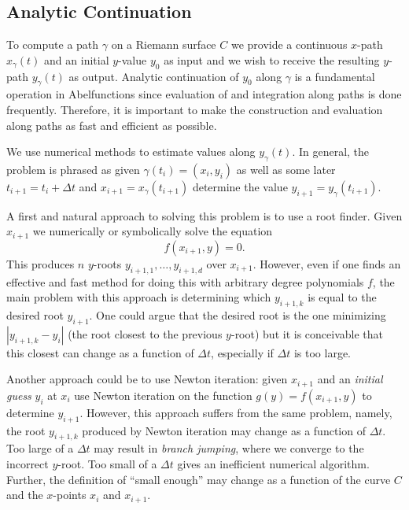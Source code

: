 \subsection{Analytic
  Continuation}\label{subsec:abelfunctions-analytic-continuation}


To compute a path $\gamma$ on a Riemann surface $C$ we provide a continuous
$x$-path $x_\gamma(t)$ and an initial $y$-value $y_0$ as input and we wish to
receive the resulting $y$-path $y_\gamma(t)$ as output. Analytic continuation of
$y_0$ along $\gamma$ is a fundamental operation in Abelfunctions since
evaluation of and integration along paths is done frequently. Therefore, it is
important to make the construction and evaluation along paths as fast and
efficient as possible.

We use numerical methods to estimate values along $y_\gamma(t)$. In general, the
problem is phrased as given $\gamma(t_i) = (x_i,y_i)$ as well as some later
$t_{i+1} = t_i + \Delta t$ and $x_{i+1} = x_\gamma(t_{i+1})$ determine the value
$y_{i+1} = y_\gamma(t_{i+1})$.

A first and natural approach to solving this problem is to use a root finder.
Given $x_{i+1}$ we numerically or symbolically solve the equation
\[
  f(x_{i+1},y) = 0.
\]
This produces $n$ $y$-roots $y_{i+1,1}, \ldots, y_{i+1,d}$ over $x_{i+1}$.
However, even if one finds an effective and fast method for doing this with
arbitrary degree polynomials $f$, the main problem with this approach is
determining which $y_{i+1,k}$ is equal to the desired root $y_{i+1}$. One could
argue that the desired root is the one minimizing $|y_{i+1,k} - y_i|$ (the root
closest to the previous $y$-root) but it is conceivable that this closest can
change as a function of $\Delta t$, especially if $\Delta t$ is too large.

Another approach could be to use Newton iteration: given $x_{i+1}$ and an {\it
  initial guess} $y_i$ at $x_i$ use Newton iteration on the function $g(y) =
f(x_{i+1}, y)$ to determine $y_{i+1}$. However, this approach suffers from the
same problem, namely, the root $y_{i+1,k}$ produced by Newton iteration may
change as a function of $\Delta t$. Too large of a $\Delta t$ may result in {\it
  branch jumping}, where we converge to the incorrect $y$-root. Too small of a
$\Delta t$ gives an inefficient numerical algorithm. Further, the definition of
``small enough'' may change as a function of the curve $C$ and the $x$-points
$x_{i}$ and $x_{i+1}$.

